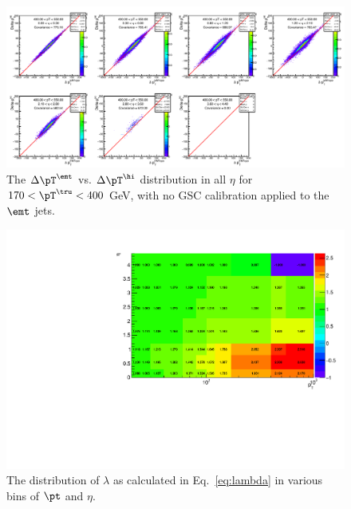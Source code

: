     \begin{figure}
        \centering
        \includegraphics[width=1\textwidth]{figures/qualification/deltapT_no_gsc}
		\caption{The $\Delta\pT^\emt$ vs. $\Delta\pT^\hi$ distribution in all $\eta$ for $ 170 < \pT^\tru < 400$ GeV, with no GSC calibration applied to the $\emt$ jets. }
		\label{fig:deltapT_no_gsc}
\end{figure}




\begin{figure}
        \centering
        \includegraphics[width=1\textwidth]{figures/qualification/lambda}
		\caption{The distribution of $\lambda$ as calculated in Eq.~\ref{eq:lambda} in various bins of $\pt$ and $\eta$.}
		\label{fig:lambda}
    \end{figure}%

